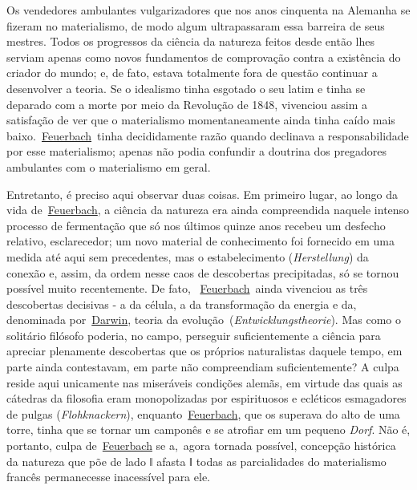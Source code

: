 Os vendedores ambulantes vulgarizadores que nos anos cinquenta na
Alemanha se fizeram no materialismo, de modo algum ultrapassaram essa
barreira de seus mestres. Todos os progressos da ciência da natureza
feitos desde então lhes serviam apenas como novos fundamentos de
comprovação contra a existência do criador do mundo; e, de fato, estava
totalmente fora de questão continuar a desenvolver a teoria. Se o
idealismo tinha esgotado o seu latim e tinha se deparado com a morte por
meio da Revolução de 1848, vivenciou assim a satisfação de ver que o
materialismo momentaneamente ainda tinha caído mais
baixo.~\href{https://www.marxists.org/portugues/dicionario/verbetes/f/feuerbach.htm}{Feuerbach}~tinha
decididamente razão quando declinava a responsabilidade por esse
materialismo; apenas não podia confundir a doutrina dos pregadores
ambulantes com o materialismo em geral.

Entretanto, é preciso aqui observar duas coisas. Em primeiro lugar, ao
longo da vida
de~\href{https://www.marxists.org/portugues/dicionario/verbetes/f/feuerbach.htm}{Feuerbach},
a ciência da natureza era ainda compreendida naquele intenso processo de
fermentação que só nos últimos quinze anos recebeu um desfecho relativo,
esclarecedor; um novo material de conhecimento foi fornecido em uma
medida até aqui sem precedentes, mas o estabelecimento
(\emph{Herstellung}) da conexão e, assim, da ordem nesse caos de
descobertas precipitadas, só se tornou possível muito recentemente. De
fato,
~\href{https://www.marxists.org/portugues/dicionario/verbetes/f/feuerbach.htm}{Feuerbach}~ainda
vivenciou as três descobertas decisivas - a da célula, a da
transformação da energia e da, denominada
por~\href{https://www.marxists.org/portugues/dicionario/verbetes/d/darwin.htm}{Darwin},
teoria da evolução~(\emph{Entwicklungstheorie}). Mas como o solitário
filósofo poderia, no campo, perseguir suficientemente a ciência para
apreciar plenamente descobertas que os próprios naturalistas daquele
tempo, em parte ainda contestavam, em parte não compreendiam
suficientemente? A culpa reside aqui unicamente nas miseráveis condições
alemãs, em virtude das quais as cátedras da filosofia eram monopolizadas
por espirituosos e ecléticos esmagadores de pulgas
(\emph{Flohknackern}),
enquanto~\href{https://www.marxists.org/portugues/dicionario/verbetes/f/feuerbach.htm}{Feuerbach},
que os superava do alto de uma torre, tinha que se tornar um camponês e
se atrofiar em um pequeno \emph{Dorf}. Não é, portanto, culpa
de~\href{https://www.marxists.org/portugues/dicionario/verbetes/f/feuerbach.htm}{Feuerbach}
se a,~agora tornada possível, concepção histórica da natureza que põe de
lado ǁ afasta ǁ todas as parcialidades do materialismo francês
permanecesse inacessível para ele.

